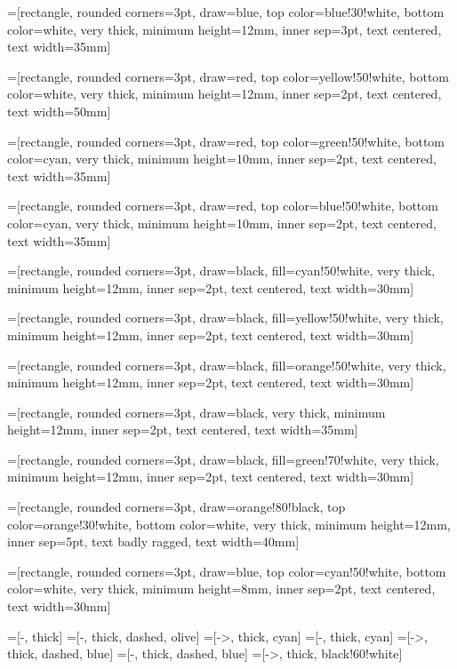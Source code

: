 
%
%

=[rectangle, rounded corners=3pt, draw=blue, top color=blue!30!white, bottom
color=white, very thick, minimum height=12mm, inner sep=3pt, text centered, text width=35mm]

=[rectangle, rounded corners=3pt, draw=red, top color=yellow!50!white, bottom
color=white, very thick, minimum height=12mm, inner sep=2pt, text centered, text width=50mm]

=[rectangle, rounded corners=3pt, draw=red, top color=green!50!white, bottom
color=cyan, very thick, minimum height=10mm, inner sep=2pt, text centered, text width=35mm]

=[rectangle, rounded corners=3pt, draw=red, top color=blue!50!white, bottom
color=cyan, very thick, minimum height=10mm, inner sep=2pt, text centered, text width=35mm]

=[rectangle, rounded corners=3pt, draw=black, fill=cyan!50!white,
 very thick, minimum height=12mm, inner sep=2pt,  text centered, text width=30mm]

=[rectangle, rounded corners=3pt, draw=black, fill=yellow!50!white,
 very thick, minimum height=12mm, inner sep=2pt,  text centered, text width=30mm]

=[rectangle, rounded corners=3pt, draw=black, fill=orange!50!white,
 very thick, minimum height=12mm, inner sep=2pt,  text centered, text width=30mm]

=[rectangle, rounded corners=3pt, draw=black,
 very thick, minimum height=12mm, inner sep=2pt,  text centered, text width=35mm]

=[rectangle, rounded corners=3pt, draw=black, fill=green!70!white,
 very thick, minimum height=12mm, inner sep=2pt,  text centered, text width=30mm]

=[rectangle, rounded corners=3pt, draw=orange!80!black, top color=orange!30!white,
bottom color=white, very thick, minimum height=12mm, inner sep=5pt, text badly ragged, text width=40mm]

=[rectangle, rounded corners=3pt, draw=blue, top color=cyan!50!white, bottom
color=white, very thick, minimum height=8mm, inner sep=2pt, text centered, text width=30mm]

=[-, thick]
=[-, thick, dashed, olive]
=[->, thick, cyan]
=[-, thick, cyan]
=[->, thick, dashed, blue]
=[-, thick, dashed, blue]
=[->, thick,  black!60!white]


